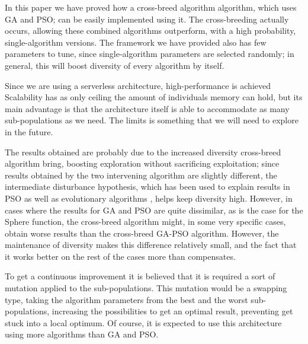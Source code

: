 \documentclass[runningheads]{llncs}
\begin{document}
In this paper we have proved how a cross-breed algorithm algorithm,
which uses GA and PSO; can be easily implemented using it. The
cross-breeding actually occurs, allowing these combined algorithms
outperform, with a high probability, single-algorithm
versions. The framework we have provided also has few parameters to
tune, since single-algorithm parameters are selected randomly; in
general, this will boost diversity of every algorithm by itself. 

Since we are using a serverless architecture, high-performance is
achieved %
Scalability has as only ceiling the amount of individuals memory can
hold, but its main advantage is that the architecture itself is able
to accommodate as many sub-populations as we need. The limits is
something that we will need to explore in the future. 

The results obtained are probably due to the increased diversity
cross-breed algorithm bring, boosting exploration without sacrificing
exploitation; since results obtained by 
the two intervening algorithm are slightly different, the intermediate
disturbance hypothesis, which has been used to explain results in PSO
\cite{gao2013particle} as well as evolutionary algorithms
\cite{merelo2008testing},  helps keep diversity high. However, in
cases 
where the results for GA and PSO are quite dissimilar, as is the case
for the Sphere function, the cross-breed algorithm might, in some very
specific cases, obtain worse results than the cross-breed  GA-PSO
algorithm. However, the maintenance of diversity makes this difference
relatively small, and the fact that it works better on the rest of the
cases more than compensates.




To get a continuous improvement it is believed that it is required a sort of
mutation applied to the sub-populations. This mutation would be a swapping type,
taking the algorithm parameters from the best and the worst sub-populations,
increasing the possibilities to get an optimal result, preventing get stuck into
a local optimum. Of course, it is expected to use this architecture using more
algorithms than GA and PSO.
\end{document}
